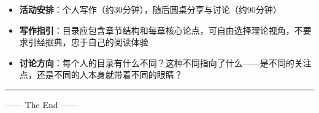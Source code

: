 \documentclass[11pt, a4paper]{ctexart}
\begin{document}
\begin{itemize}
  \item \textbf{活动安排}：个人写作（约30分钟），随后圆桌分享与讨论（约90分钟）
  \item \textbf{写作指引}：目录应包含章节结构和每章核心论点，可自由选择理论视角，不要求引经据典，忠于自己的阅读体验
  \item \textbf{讨论方向}：每个人的目录有什么不同？这种不同指向了什么——是不同的关注点，还是不同的人本身就带着不同的眼睛？
\end{itemize}

\vspace{1em}
\noindent\rule{\textwidth}{0.4pt}
\vspace{0.5em}

\begin{center}
{\small —— The End ——}
\end{center}
\end{document}
